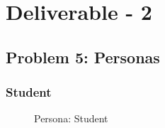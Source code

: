\documentclass[a4paper,12pt]{report}
\begin{document}

\newpage

\tableofcontents




\chapter*{\centering Deliverable - 2}

\section{Problem 5: Personas}

\FloatBarrier
\subsection{Student}
\begin{figure}[!htb]
	\caption{\label{fig:persona_student}Persona: Student}	
\end{figure}
\end{document}
